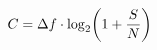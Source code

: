 \documentclass[preview]{standalone}
\begin{document}
\begin{align*}
\special{dvisvgm:raw <g id='unique000'>}C = \Delta f \cdot \log_2\!\left(1 + \frac{S}{N}\right)\special{dvisvgm:raw </g>}
\end{align*}
\end{document}

